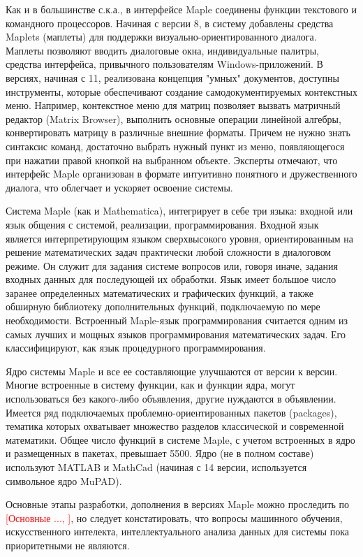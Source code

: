 Как и в большинстве с.к.а., в интерфейсе Maple соединены функции текстового и командного процессоров. Начиная с версии 8, в систему добавлены средства Maplets (маплеты) для поддержки визуально-ориентированного диалога. Маплеты позволяют вводить диалоговые окна, индивидуальные палитры, средства интерфейса, привычного пользователям Windows-приложений. В версиях, начиная с 11, реализована концепция "умных"{} документов, доступны инструменты, которые обеспечивают создание самодокументируемых контекстных меню. Например, контекстное меню для матриц позволяет вызвать матричный редактор (Matrix Browser), выполнить основные операции линейной алгебры, конвертировать матрицу в различные внешние форматы. Причем не нужно знать синтаксис команд, достаточно выбрать нужный пункт из меню, появляющегося при нажатии правой кнопкой на выбранном объекте. Эксперты отмечают, что интерфейс Maple организован в формате интуитивно понятного и дружественного диалога, что облегчает и ускоряет освоение системы.

Система Maple (как и Mathematica), интегрирует в себе три языка: входной или язык общения с системой, реализации, программирования.
Входной язык является интерпретирующим языком сверхвысокого уровня, ориентированным на решение математических задач практически любой сложности в диалоговом режиме. Он служит для задания системе вопросов или, говоря иначе, задания входных данных для последующей их обработки. Язык имеет большое число заранее определенных математических и графических функций, а также обширную библиотеку дополнительных функций, подключаемую по мере необходимости. Встроенный Maple-язык программирования считается одним из самых лучших и мощных языков программирования математических задач. Его классифицируют, как язык процедурного программирования.

Ядро системы Maple и все ее составляющие улучшаются от версии к версии. Многие встроенные в систему функции, как и функции ядра, могут использоваться без какого-либо объявления, другие нуждаются в объявлении. Имеется ряд подключаемых проблемно-ориентированных пакетов (packages), тематика которых охватывает множество разделов классической и современной математики. Общее число функций в системе Maple, с учетом встроенных в ядро и размещенных в пакетах, превышает 5500. Ядро (не в полном составе) используют MATLAB и MathCad (начиная с 14 версии, используется символьное ядро MuPAD).

Основные этапы разработки, дополнения в версиях Maple можно проследить по \textcolor{red}{[Основные ..., ]}, но следует констатировать, что вопросы машинного обучения, искусственного интелекта, интеллектуального анализа данных для системы пока приоритетными не являются.

